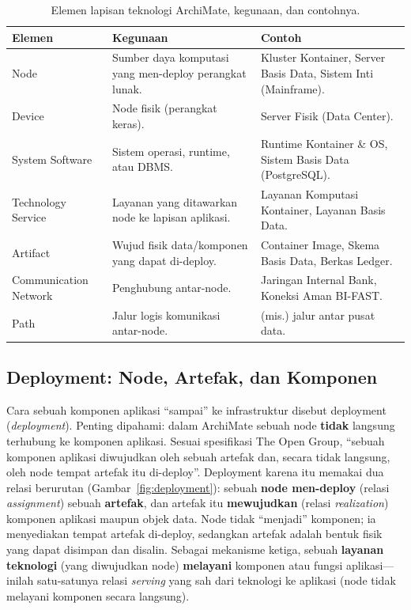 \begin{table}[htbp]
\centering
\scriptsize
\caption{Elemen lapisan teknologi ArchiMate, kegunaan, dan contohnya.}
\label{tab:tech-elements}
\begin{tabularx}{\textwidth}{@{}p{} p{} X@{}}
\hline
\textbf{Elemen} & \textbf{Kegunaan} & \textbf{Contoh} \\
\hline
Node & Sumber daya komputasi yang men-deploy perangkat lunak. & Kluster Kontainer,
Server Basis Data, Sistem Inti (Mainframe). \\
Device & Node fisik (perangkat keras). & Server Fisik (Data Center). \\
System Software & Sistem operasi, runtime, atau DBMS. & Runtime Kontainer \& OS,
Sistem Basis Data (PostgreSQL). \\
Technology Service & Layanan yang ditawarkan node ke lapisan aplikasi. & Layanan
Komputasi Kontainer, Layanan Basis Data. \\
Artifact & Wujud fisik data/komponen yang dapat di-deploy. & Container Image, Skema
Basis Data, Berkas Ledger. \\
Communication Network & Penghubung antar-node. & Jaringan Internal Bank, Koneksi
Aman BI-FAST. \\
Path & Jalur logis komunikasi antar-node. & (mis.) jalur antar pusat data. \\
\hline
\end{tabularx}
\end{table}

\subsection{Deployment: Node, Artefak, dan Komponen}

Cara sebuah komponen aplikasi ``sampai'' ke infrastruktur disebut deployment
(\emph{deployment}). Penting dipahami: dalam ArchiMate sebuah node \textbf{tidak}
langsung terhubung ke komponen aplikasi. Sesuai spesifikasi The Open Group,
``sebuah komponen aplikasi diwujudkan oleh sebuah artefak dan, secara tidak
langsung, oleh node tempat artefak itu di-deploy''. Deployment karena itu memakai
dua relasi berurutan (Gambar~\ref{fig:deployment}): sebuah \textbf{node
men-deploy} (relasi \emph{assignment}) sebuah \textbf{artefak}, dan artefak itu
\textbf{mewujudkan} (relasi \emph{realization}) komponen aplikasi maupun objek
data. Node tidak ``menjadi'' komponen; ia menyediakan tempat artefak di-deploy,
sedangkan artefak adalah bentuk fisik yang dapat disimpan dan disalin. Sebagai
mekanisme ketiga, sebuah \textbf{layanan teknologi} (yang diwujudkan node)
\textbf{melayani} komponen atau fungsi aplikasi---inilah satu-satunya relasi
\emph{serving} yang sah dari teknologi ke aplikasi (node tidak melayani komponen
secara langsung).

